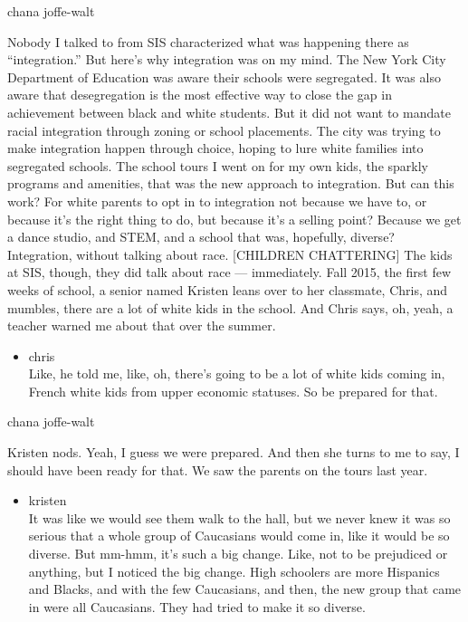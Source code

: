 chana joffe-walt

Nobody I talked to from SIS characterized what was happening there as
``integration.'' But here's why integration was on my mind. The New York
City Department of Education was aware their schools were segregated. It
was also aware that desegregation is the most effective way to close the
gap in achievement between black and white students. But it did not want
to mandate racial integration through zoning or school placements. The
city was trying to make integration happen through choice, hoping to
lure white families into segregated schools. The school tours I went on
for my own kids, the sparkly programs and amenities, that was the new
approach to integration. But can this work? For white parents to opt in
to integration not because we have to, or because it's the right thing
to do, but because it's a selling point? Because we get a dance studio,
and STEM, and a school that was, hopefully, diverse? Integration,
without talking about race. {[}CHILDREN CHATTERING{]} The kids at SIS,
though, they did talk about race --- immediately. Fall 2015, the first
few weeks of school, a senior named Kristen leans over to her classmate,
Chris, and mumbles, there are a lot of white kids in the school. And
Chris says, oh, yeah, a teacher warned me about that over the summer.

\begin{itemize}
\tightlist
\item
  chris\\
  Like, he told me, like, oh, there's going to be a lot of white kids
  coming in, French white kids from upper economic statuses. So be
  prepared for that.
\end{itemize}

chana joffe-walt

Kristen nods. Yeah, I guess we were prepared. And then she turns to me
to say, I should have been ready for that. We saw the parents on the
tours last year.

\begin{itemize}
\tightlist
\item
  kristen\\
  It was like we would see them walk to the hall, but we never knew it
  was so serious that a whole group of Caucasians would come in, like it
  would be so diverse. But mm-hmm, it's such a big change. Like, not to
  be prejudiced or anything, but I noticed the big change. High
  schoolers are more Hispanics and Blacks, and with the few Caucasians,
  and then, the new group that came in were all Caucasians. They had
  tried to make it so diverse.
\end{itemize}

